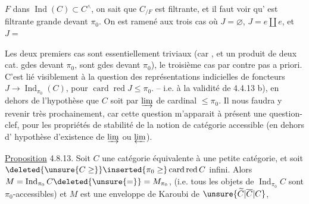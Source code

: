 
$F$ dans $\operatorname{Ind}(C)\subset C^\wedge$, on sait que $C_{/F}$ est filtrante, et il faut voir qu' est filtrante grande devant $\pi_0$. On est ramené aux trois cas où $J=\varnothing$, $J=e\amalg e$, et $J=$


Les deux premiers cas sont essentiellement triviaux (car , et un produit de deux cat. gdes devant $\pi_0$, sont gdes devant $\pi_0$), le troisième cas par contre  pas   a priori. C'est lié visiblement à la question des représentations indicielles de foncteurs $J\longrightarrow\operatorname{Ind}_{\pi_0}(C)$, pour $\operatorname{card}\operatorname{red}J\leq\pi_0$. -- i.e. à la validité de 4.4.13 b), en dehors de l'hypothèse que $C$ soit  par $\varinjlim$ de cardinal $\leq\pi_0$. Il nous faudra y revenir très prochainement, car cette question m'apparait à présent une question-clef, pour les propriétés de stabilité de la notion de catégorie accessible (en dehors d' hypothèse d'existence de $\varinjlim$ ou $\varprojlim$).


\uline{Proposition} 4.8.13.  Soit $C$ une catégorie équivalente à une petite catégorie, et  soit $\deleted{\unsure{C\geq}}\inserted{\pi_0\geq}\operatorname{card}\operatorname{red}C$   infini. Alors $M=\operatorname{Ind}_{\pi_0}C\deleted{\unsure{=}}=M_{\pi_0}$,  (i.e. tous les objets de $\operatorname{Ind}_{\pi_0}C$ sont $\pi_0$-accessibles) et $M$ est une enveloppe de Karoubi de $\unsure{\widetilde C|\overline C|C}$,
